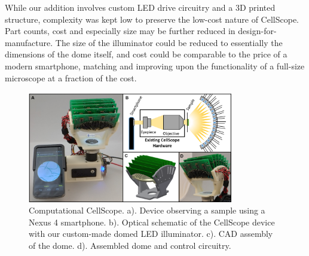 While our addition involves custom LED drive circuitry and a 3D printed structure, complexity was kept low to preserve the low-cost nature of CellScope. Part counts, cost and especially size may be further reduced in design-for-manufacture. The size of the illuminator could be reduced to essentially the dimensions of the dome itself, and cost could be comparable to the price of a modern smartphone, matching and improving upon the functionality of a full-size microscope at a fraction of the cost.

\begin{figure} [ht]
\begin{center}
\includegraphics[width=0.8\textwidth]{figures/fig_ccs_system.png}
\end{center}
\caption {{Computational CellScope.} {a).} Device observing a sample using a Nexus 4 smartphone. {b).} Optical schematic of the CellScope device with our custom-made domed LED illuminator. {c).} CAD assembly of the dome. {d).} Assembled dome and control circuitry.}
\label{fig:fabrication:device}
\end{figure}

